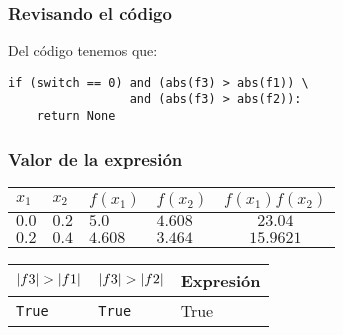 \documentclass[12pt]{beamer}
\begin{document}
\begin{frame}[fragile]
\frametitle{Revisando el código}
Del código tenemos que:
\pause
\begin{verbatim}
if (switch == 0) and (abs(f3) > abs(f1)) \ 
                 and (abs(f3) > abs(f2)):
    return None
\end{verbatim}
\end{frame}
\begin{frame}[fragile]
\frametitle{Valor de la expresión}
\begin{table}
\centering
\renewcommand{\arraystretch}{0.9}
\begin{tabular}{l | l | l | l | c}
$x_{1}$ & $x_{2}$ & $f(x_{1})$ & $f(x_{2})$ & $f (x_{1}) f (x_{2})$ \\ \hline
$0.0$ & $0.2$ & $5.0$ & $4.608$ & $23.04$ \\ \hline
$0.2$ & $0.4$ & $4.608$ & $3.464$ & $15.9621$ \\ \hline
\end{tabular}
\end{table}    

\begin{table}
    \centering  
\begin{tabular}{l  | l | l}
$\abs{f3} > \abs{f1}$ & $\abs{f3} > \abs{f2}$ & Expresión \\ \hline
\texttt{True} & \texttt{True} & True \\ \hline
\end{tabular}
\end{table}

\end{frame}
\end{document}
